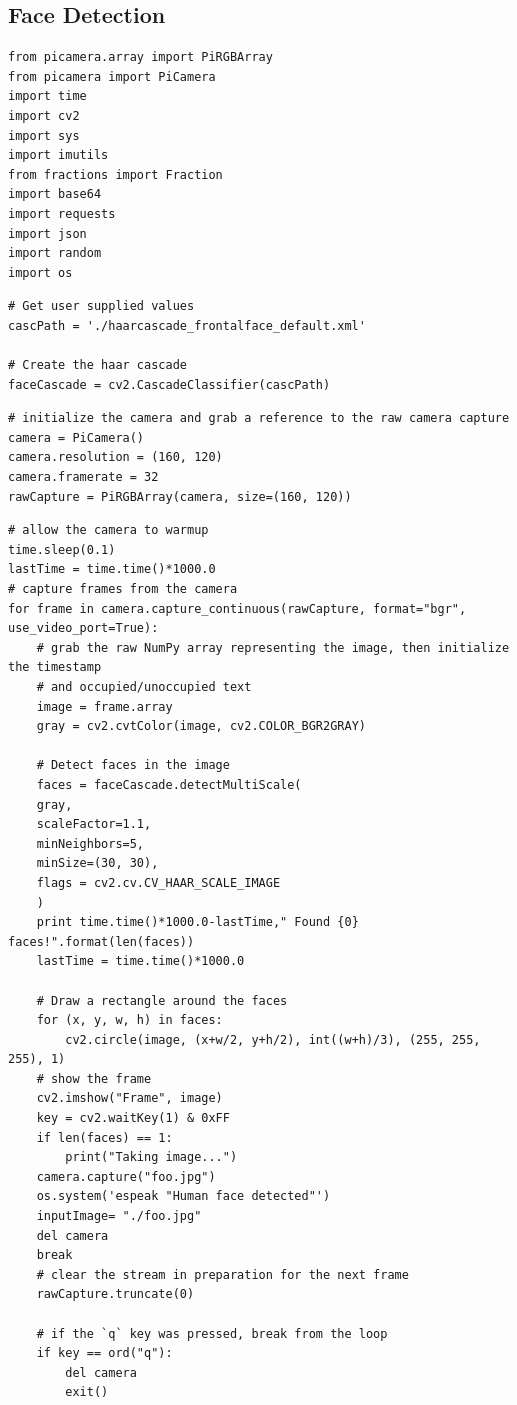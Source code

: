 \documentclass[sigconf]{acmart}
\begin{document}
\subsection{Face Detection}
\begin{lstlisting}
from picamera.array import PiRGBArray
from picamera import PiCamera
import time
import cv2
import sys
import imutils
from fractions import Fraction
import base64
import requests
import json
import random
import os
\end{lstlisting}


\begin{lstlisting}
# Get user supplied values
cascPath = './haarcascade_frontalface_default.xml'

# Create the haar cascade
faceCascade = cv2.CascadeClassifier(cascPath)
\end{lstlisting}

\begin{lstlisting}
# initialize the camera and grab a reference to the raw camera capture
camera = PiCamera()
camera.resolution = (160, 120)
camera.framerate = 32
rawCapture = PiRGBArray(camera, size=(160, 120))
\end{lstlisting}

\begin{lstlisting}
# allow the camera to warmup
time.sleep(0.1)
lastTime = time.time()*1000.0
# capture frames from the camera
for frame in camera.capture_continuous(rawCapture, format="bgr", use_video_port=True):
	# grab the raw NumPy array representing the image, then initialize the timestamp
	# and occupied/unoccupied text
    image = frame.array
    gray = cv2.cvtColor(image, cv2.COLOR_BGR2GRAY)
    
    # Detect faces in the image
    faces = faceCascade.detectMultiScale(
    gray,
    scaleFactor=1.1,
    minNeighbors=5,
    minSize=(30, 30),
    flags = cv2.cv.CV_HAAR_SCALE_IMAGE
    )
    print time.time()*1000.0-lastTime," Found {0} faces!".format(len(faces))
    lastTime = time.time()*1000.0

    # Draw a rectangle around the faces
    for (x, y, w, h) in faces:
        cv2.circle(image, (x+w/2, y+h/2), int((w+h)/3), (255, 255, 255), 1)
    # show the frame
    cv2.imshow("Frame", image)
    key = cv2.waitKey(1) & 0xFF
    if len(faces) == 1:
        print("Taking image...")
	camera.capture("foo.jpg")
	os.system('espeak "Human face detected"')
	inputImage= "./foo.jpg"
	del camera
	break 
	# clear the stream in preparation for the next frame
    rawCapture.truncate(0)
    
	# if the `q` key was pressed, break from the loop
    if key == ord("q"):
        del camera
        exit()
\end{lstlisting}
\end{document}
